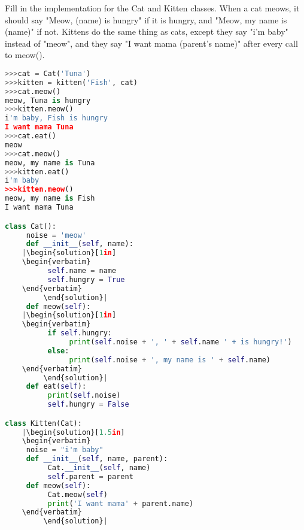 \question
Fill in the implementation for the Cat and Kitten classes. When a cat meows, it should say "Meow, (name) is hungry" if it is hungry, and "Meow, my name is (name)" if not. Kittens do the same thing as cats, except they say "i'm baby" instead of "meow", and they say "I want mama (parent’s name)" after every call to meow(). 

\begin{lstlisting}[language=Python]
>>>cat = Cat('Tuna')
>>>kitten = kitten('Fish', cat)
>>>cat.meow()
meow, Tuna is hungry
>>>kitten.meow()
i'm baby, Fish is hungry
I want mama Tuna
>>>cat.eat()
meow
>>>cat.meow()
meow, my name is Tuna
>>>kitten.eat()
i'm baby
>>>kitten.meow()
meow, my name is Fish
I want mama Tuna

class Cat():
     noise = 'meow'
     def __init__(self, name):
	|\begin{solution}[1in]
	\begin{verbatim}
          self.name = name
          self.hungry = True
	\end{verbatim}
         \end{solution}|
     def meow(self):
	|\begin{solution}[1in]
	\begin{verbatim}
          if self.hungry:
               print(self.noise + ', ' + self.name ' + is hungry!')
          else:
               print(self.noise + ', my name is ' + self.name)
	\end{verbatim}	
         \end{solution}|
     def eat(self):
          print(self.noise) 
          self.hungry = False

class Kitten(Cat):
	|\begin{solution}[1.5in]
	\begin{verbatim}
     noise = "i'm baby"
     def __init__(self, name, parent):
          Cat.__init__(self, name)
          self.parent = parent
     def meow(self):
          Cat.meow(self)
          print('I want mama' + parent.name)
	\end{verbatim}
         \end{solution}|
\end{lstlisting}